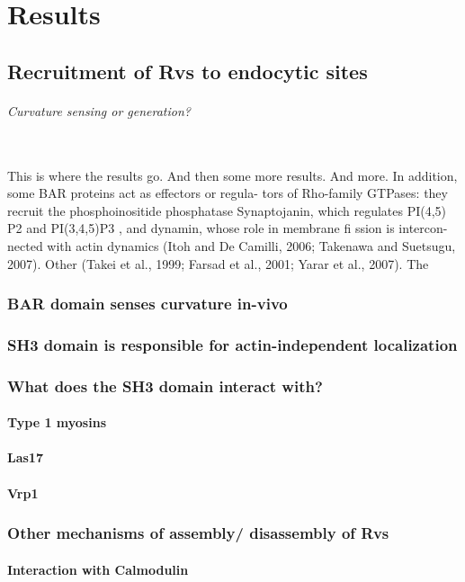 \chapter{Results}    \label{results}
\section{Recruitment of Rvs to endocytic sites}

	\subparagraph{Curvature sensing or generation? }
	\mbox{}\\
	This is where the results go. And then some more results. And more.
In addition, some BAR proteins act as effectors or regula- tors of Rho-family GTPases: they recruit the phosphoinositide phosphatase Synaptojanin, which regulates PI(4,5) P2
and PI(3,4,5)P3 , and dynamin, whose
role in membrane fi ssion is intercon- nected with actin dynamics (Itoh and De Camilli, 2006; Takenawa and Suetsugu,
2007). Other
(Takei et al., 1999; Farsad et al., 2001; Yarar et al., 2007). The

	\subsection{BAR domain senses curvature in-vivo}
	\subsection{SH3 domain is responsible for actin-independent	localization}
	\subsection{What does the SH3 domain interact with?}
		\subsubsection{Type 1 myosins}
		\subsubsection{Las17}
		\subsubsection{Vrp1}

	\subsection{Other mechanisms of assembly/ disassembly of Rvs}		
			\subsubsection{Interaction with Calmodulin}
